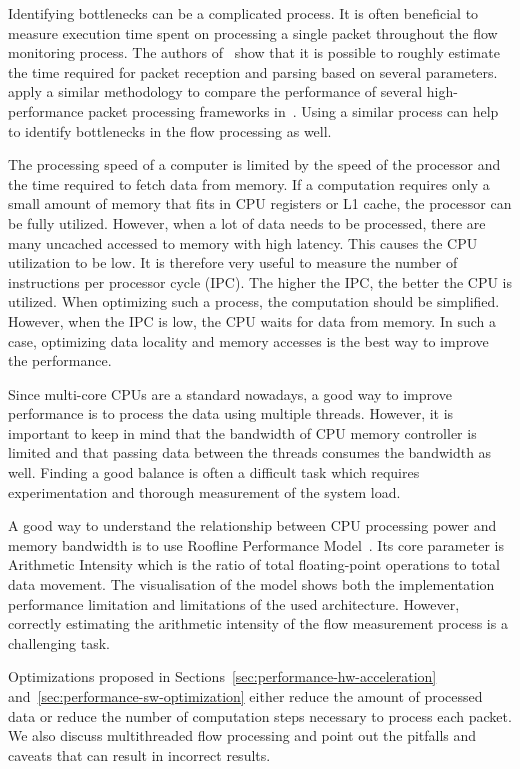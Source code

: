 Identifying bottlenecks can be a complicated process. It is often beneficial to measure execution time spent on processing a single packet throughout the flow monitoring process. The authors of~\cite{NETCOPETechnologies-2017-Modelling} show that it is possible to roughly estimate the time required for packet reception and parsing based on several parameters. \citeauthor{Gallenmueller-2015-Comparison} apply a similar methodology to compare the performance of several high-performance packet processing frameworks in~\cite{Gallenmueller-2015-Comparison}. Using a similar process can help to identify bottlenecks in the flow processing as well.

The processing speed of a computer is limited by the speed of the processor and the time required to fetch data from memory. If a computation requires only a small amount of memory that fits in CPU registers or L1 cache, the processor can be fully utilized. However, when a lot of data needs to be processed, there are many uncached accessed to memory with high latency. This causes the CPU utilization to be low. It is therefore very useful to measure the number of instructions per processor cycle (IPC). The higher the IPC, the better the CPU is utilized. When optimizing such a process, the computation should be simplified. However, when the IPC is low, the CPU waits for data from memory. In such a case, optimizing data locality and memory accesses is the best way to improve the performance. 

Since multi-core CPUs are a standard nowadays, a good way to improve performance is to process the data using multiple threads. However, it is important to keep in mind that the bandwidth of CPU memory controller is limited and that passing data between the threads consumes the bandwidth as well. Finding a good balance is often a difficult task which requires experimentation and thorough measurement of the system load.

A good way to understand the relationship between CPU processing power and memory bandwidth is to use Roofline Performance Model~\cite{Williams-2009-Roofline}. Its core parameter is Arithmetic Intensity which is the ratio of total floating-point operations to total data movement. The visualisation of the model shows both the implementation performance limitation and limitations of the used architecture. However, correctly estimating the arithmetic intensity of the flow measurement process is a challenging task.

Optimizations proposed in Sections~\ref{sec:performance-hw-acceleration} and~\ref{sec:performance-sw-optimization} either reduce the amount of processed data or reduce the number of computation steps necessary to process each packet. We also discuss multithreaded flow processing and point out the pitfalls and caveats that can result in incorrect results.


